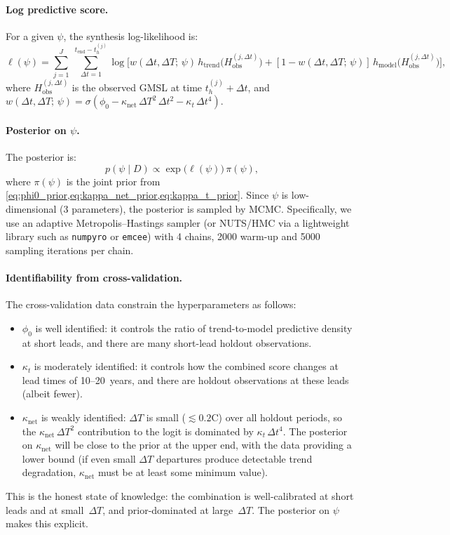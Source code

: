 \documentclass[11pt]{article}
\newcommand{\dT}{\Delta T}
\newcommand{\tend}{t_{\mathrm{end}}}
\begin{document}
\paragraph{Log predictive score.}  For a given $\psi$, the synthesis log-likelihood is:
\begin{equation}
  \ell(\psi) = \sum_{j=1}^{J}\; \sum_{\Delta t = 1}^{\tend - t_h^{(j)}} \log\!\Big[w(\Delta t, \dT;\,\psi)\,h_{\mathrm{trend}}\!\big(H_{\mathrm{obs}}^{(j,\Delta t)}\big) + [1 - w(\Delta t, \dT;\,\psi)]\,h_{\mathrm{model}}\!\big(H_{\mathrm{obs}}^{(j,\Delta t)}\big)\Big],
  \label{eq:cv_loglik}
\end{equation}
where $H_{\mathrm{obs}}^{(j,\Delta t)}$ is the observed GMSL at time $t_h^{(j)} + \Delta t$, and $w(\Delta t, \dT;\,\psi) = \sigma(\phi_0 - \kappa_{\mathrm{net}}\,\dT^2\,\Delta t^2 - \kappa_t\,\Delta t^4)$.

\paragraph{Posterior on $\psi$.}  The posterior is:
\begin{equation}
  p(\psi \mid D) \propto \exp\!\big(\ell(\psi)\big)\,\pi(\psi),
  \label{eq:psi_posterior}
\end{equation}
where $\pi(\psi)$ is the joint prior from \cref{eq:phi0_prior,eq:kappa_net_prior,eq:kappa_t_prior}.  Since $\psi$ is low-dimensional (3 parameters), the posterior is sampled by MCMC.  Specifically, we use an adaptive Metropolis--Hastings sampler (or NUTS/HMC via a lightweight library such as \texttt{numpyro} or \texttt{emcee}) with 4 chains, 2000 warm-up and 5000 sampling iterations per chain.

\paragraph{Identifiability from cross-validation.}  The cross-validation data constrain the hyperparameters as follows:
\begin{itemize}
  \item $\phi_0$ is well identified: it controls the ratio of trend-to-model predictive density at short leads, and there are many short-lead holdout observations.
  \item $\kappa_t$ is moderately identified: it controls how the combined score changes at lead times of 10--20~years, and there are holdout observations at these leads (albeit fewer).
  \item $\kappa_{\mathrm{net}}$ is weakly identified: $\dT$ is small ($\lesssim 0.2$\textdegree C) over all holdout periods, so the $\kappa_{\mathrm{net}}\,\dT^2$ contribution to the logit is dominated by $\kappa_t\,\Delta t^4$.  The posterior on $\kappa_{\mathrm{net}}$ will be close to the prior at the upper end, with the data providing a lower bound (if even small $\dT$ departures produce detectable trend degradation, $\kappa_{\mathrm{net}}$ must be at least some minimum value).
\end{itemize}
This is the honest state of knowledge: the combination is well-calibrated at short leads and at small~$\dT$, and prior-dominated at large~$\dT$.  The posterior on $\psi$ makes this explicit.
\end{document}

